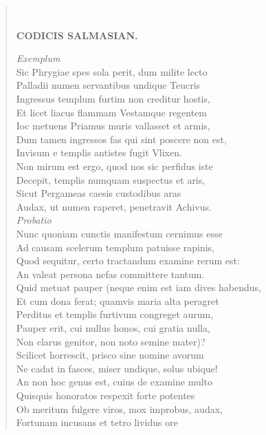 \documentclass[11pt, a4paper]{report}
\begin{document}
\begin{verse}
        ﻿\pagebreak 
    \begin{center} \textbf{CODICIS SALMASIAN.} \end{center} \marginpar{[91]} \textit{Exemplum} \\ Sic Phrygiae spes sola perit, dum milite lecto \\ Palladii numen servantibus undique Teucris \\ Ingressus templum furtim non creditur hostis, \\ Et licet liacus flammam Vestamque regentem \\ Ioc metuens Priamus muris vallasset et armis, \\ Dum tamen ingressos fas qui sint poscere non est, \\ Invisum e templis antistes fugit Vlixen. \\ Non mirum est ergo, quod nos sic perfidus iste \\ Decepit, templis numquam suspectus et aris, \\ Sicut Pergameas caesis custodibus aras \\ Audax, ut numen raperet, penetravit Achivus. \\ \textit{ \lbrack Probatio \rbrack } \\ Nunc quoniam cunctis manifestum cernimus esse \\ Ad causam scelerum templum patuisse rapinis, \\ Quod sequitur, certo tractandum examine rerum est: \\ An valeat persona nefas committere tantum. \\ Quid metuat pauper (neque enim est iam dives habendus, \\ Et cum dona ferat; quamvis maria alta peragret \\ Perditus et templis furtivum congreget aurum, \\ Pauper erit, cui nullus honos, cui gratia nulla, \\ Non clarus genitor, non noto semine mater)? \\ Scilicet horrescit, prisco sine nomine avorum \\ Ne cadat in fasces, miser undique, solus ubique! \\ An non hoc genus est, cuius de examine multo \\ Quisquis honoratos respexit forte potentes \\ Ob meritum fulgere viros, mox improbus, audax, \\ Fortunam incusans et tetro lividus ore \\ 

\end{verse}
\end{document}
